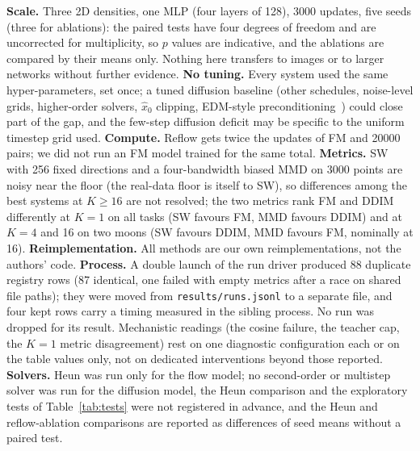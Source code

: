 \textbf{Scale.} Three 2D densities, one MLP (four layers of 128), 3000 updates, five seeds (three for ablations): the paired tests have four degrees of freedom and are uncorrected for multiplicity, so $p$ values are indicative, and the ablations are compared by their means only. Nothing here transfers to images or to larger networks without further evidence. \textbf{No tuning.} Every system used the same hyper-parameters, set once; a tuned diffusion baseline (other schedules, noise-level grids, higher-order solvers, $\hat x_0$ clipping, EDM-style preconditioning~\cite{karras2022elucidating}) could close part of the gap, and the few-step diffusion deficit may be specific to the uniform timestep grid used. \textbf{Compute.} Reflow gets twice the updates of FM and 20000 pairs; we did not run an FM model trained for the same total. \textbf{Metrics.} SW with 256 fixed directions and a four-bandwidth biased MMD on 3000 points are noisy near the floor (the real-data floor is itself  to  SW), so differences among the best systems at $K\ge16$ are not resolved; the two metrics rank FM and DDIM differently at $K{=}1$ on all tasks (SW favours FM, MMD favours DDIM) and at $K{=}4$ and 16 on two moons (SW favours DDIM, MMD favours FM, nominally at 16). \textbf{Reimplementation.} All methods are our own reimplementations, not the authors' code. \textbf{Process.} A double launch of the run driver produced 88 duplicate registry rows (87 identical, one failed with empty metrics after a race on shared file paths); they were moved from \texttt{results/runs.jsonl} to a separate file, and four kept rows carry a timing measured in the sibling process. No run was dropped for its result. Mechanistic readings (the cosine failure, the teacher cap, the $K{=}1$ metric disagreement) rest on one diagnostic configuration each or on the table values only, not on dedicated interventions beyond those reported. \textbf{Solvers.} Heun was run only for the flow model; no second-order or multistep solver was run for the diffusion model, the Heun comparison and the exploratory tests of Table~\ref{tab:tests} were not registered in advance, and the Heun and reflow-ablation comparisons are reported as differences of seed means without a paired test.
